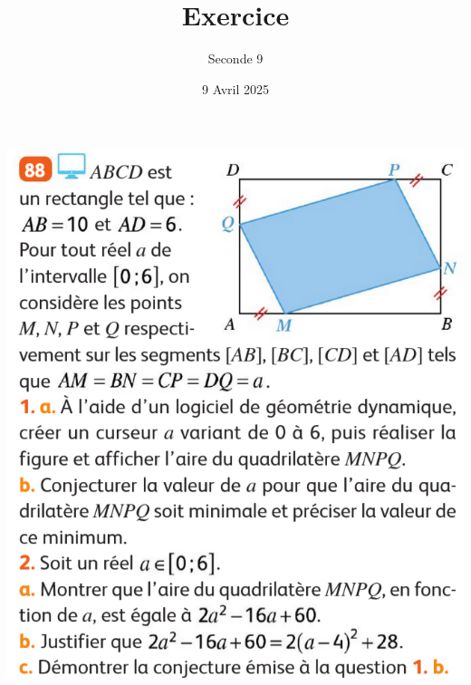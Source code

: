 \documentclass{article}
\title{Exercice}
\date{9 Avril 2025}
\author{Seconde 9}
\begin{document}
\maketitle
\begin{center}
\includegraphics[width=\textwidth]{Exercice_1.png}
\end{center}
\end{document}
